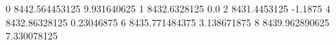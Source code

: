 0 8442.564453125 9.931640625
1 8432.6328125 0.0
2 8431.4453125 -1.1875
4 8432.86328125 0.23046875
6 8435.771484375 3.138671875
8 8439.962890625 7.330078125
